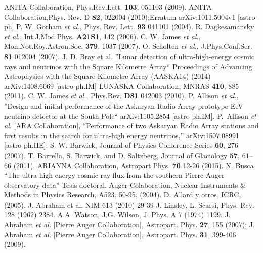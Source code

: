 \begin{thebibliography}{1}
 ANITA Collaboration, Phys.Rev.Lett. \textbf{103},  051103 (2009).
ANITA Collaboration,Phys. Rev. D \textbf{82}, 022004 (2010);\newline Erratum arXiv:1011.5004v1 [astro-ph]
  P. W. Gorham {\it et al.},  Phys. Rev. Lett. \textbf{93}  041101 (2004).
 R. Dagkesamansky {\it et al.}, Int.J.Mod.Phys. \textbf{A21S1},  142 (2006).
 C. W. James {\it et al.}, Mon.Not.Roy.Astron.Soc. \textbf{379}, 1037 (2007).
  O. Scholten {\it et al.}, J.Phys.Conf.Ser. \textbf{81}  012004 (2007).
 J. D. Bray et al. ''Lunar detection of ultra-high-energy cosmic rays and neutrinos with the Square Kilometre Array`` Proceedings of Advancing Astrophysics with the Square Kilometre Array (AASKA14) (2014) arXiv:1408.6069 [astro-ph.IM]
 LUNASKA Collaboration, MNRAS \textbf{410}, 885 (2011).
  C. W. James {\it et al.}, Phys.Rev. \textbf{D81}  042003 (2010).
 P. Allison {\it et al.}, ''Design and initial performance of the Askaryan Radio Array prototype EeV neutrino detector at the South Pole`` arXiv:1105.2854 [astro-ph.IM].
 P.~Allison {\it et al.} [ARA Collaboration], ``Performance of two Askaryan Radio Array stations and first results in the search for ultra-high energy neutrinos,'' arXiv:1507.08991 [astro-ph.HE].
 S. W. Barwick, Journal of Physics Conference Series \textbf{60}, 276 (2007).
  T. Barrella, S. Barwick, and D. Saltzberg, Journal of Glaciology \textbf{57}, 61–66 (2011).
 ARIANNA Collaboration, Astropart.Phys. \textbf{70} 12-26 (2015).
 N. Busca ``The ultra high energy cosmic ray flux from the southern Pierre Auger observatory data'' Tesis doctoral.
 Auger Colaboration, Nuclear Instruments \& Methods in Physics Research, A523, 50-95, (2004).
 D. Allard y otros, ICRC, (2005).
 J. Abraham et al. NIM 613 (2010) 29-39
 J. Linsley, L. Scarsi, Phys. Rev. 128 (1962) 2384.
 A.A. Watson, J.G. Wilson, J. Phys. A 7 (1974) 1199.
 J. Abraham {\it et al.} [Pierre Auger Collaboration], Astropart. Phys. \textbf{27}, 155 (2007); J. Abraham {\it et al.} [Pierre Auger Collaboration], Astropart. Phys. {\bf 31}, 399-406 (2009).

\end{thebibliography}
